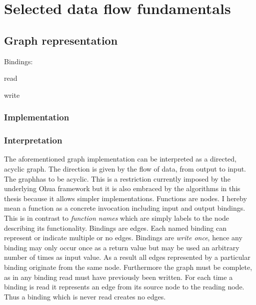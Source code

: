 
\chapter{Selected data flow fundamentals} %

\label{ChapterDataFlow} %


\section{Graph representation}

Bindings:

read

write

\subsection{Implementation}

\subsection{Interpretation}

The aforementioned graph implementation can be interpreted as a directed, acyclic graph.
The direction is given by the flow of data, from output to input.
The graphhas to be acyclic.
This is a restriction currently imposed by the underlying Ohua framework but it is also embraced by the algorithms in this thesis because it allows simpler implementations.
Functions are nodes.
I hereby mean a function as a concrete invocation including input and output bindings.
This is in contrast to \textit{function names} which are simply labels to the node describing its functionality.
Bindings are edges.
Each named binding can represent or indicate multiple or no edges.
Bindings are \textit{write once}, hence any binding may only occur once as a return value but may be used an arbitrary number of times as input value.
As a result all edges represented by a particular binding originate from the same node.
Furthermore the graph must be complete, as in any binding read must have previously been written.
For each time a binding is read it represents an edge from its source node to the reading node.
Thus a binding which is never read creates no edges.
